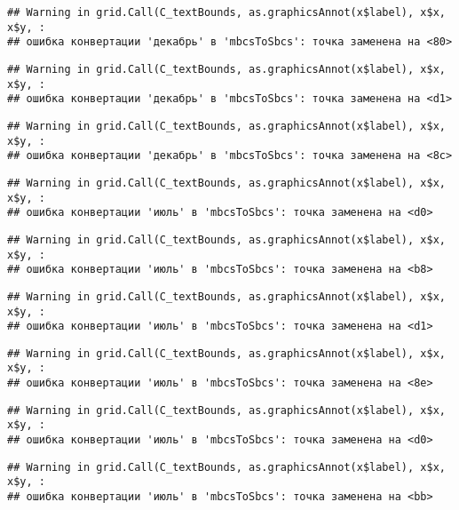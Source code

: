 \documentclass[
]{article}
\begin{document}
\begin{verbatim}
## Warning in grid.Call(C_textBounds, as.graphicsAnnot(x$label), x$x, x$y, :
## ошибка конвертации 'декабрь' в 'mbcsToSbcs': точка заменена на <80>
\end{verbatim}

\begin{verbatim}
## Warning in grid.Call(C_textBounds, as.graphicsAnnot(x$label), x$x, x$y, :
## ошибка конвертации 'декабрь' в 'mbcsToSbcs': точка заменена на <d1>
\end{verbatim}

\begin{verbatim}
## Warning in grid.Call(C_textBounds, as.graphicsAnnot(x$label), x$x, x$y, :
## ошибка конвертации 'декабрь' в 'mbcsToSbcs': точка заменена на <8c>
\end{verbatim}

\begin{verbatim}
## Warning in grid.Call(C_textBounds, as.graphicsAnnot(x$label), x$x, x$y, :
## ошибка конвертации 'июль' в 'mbcsToSbcs': точка заменена на <d0>
\end{verbatim}

\begin{verbatim}
## Warning in grid.Call(C_textBounds, as.graphicsAnnot(x$label), x$x, x$y, :
## ошибка конвертации 'июль' в 'mbcsToSbcs': точка заменена на <b8>
\end{verbatim}

\begin{verbatim}
## Warning in grid.Call(C_textBounds, as.graphicsAnnot(x$label), x$x, x$y, :
## ошибка конвертации 'июль' в 'mbcsToSbcs': точка заменена на <d1>
\end{verbatim}

\begin{verbatim}
## Warning in grid.Call(C_textBounds, as.graphicsAnnot(x$label), x$x, x$y, :
## ошибка конвертации 'июль' в 'mbcsToSbcs': точка заменена на <8e>
\end{verbatim}

\begin{verbatim}
## Warning in grid.Call(C_textBounds, as.graphicsAnnot(x$label), x$x, x$y, :
## ошибка конвертации 'июль' в 'mbcsToSbcs': точка заменена на <d0>
\end{verbatim}

\begin{verbatim}
## Warning in grid.Call(C_textBounds, as.graphicsAnnot(x$label), x$x, x$y, :
## ошибка конвертации 'июль' в 'mbcsToSbcs': точка заменена на <bb>
\end{verbatim}
\end{document}
